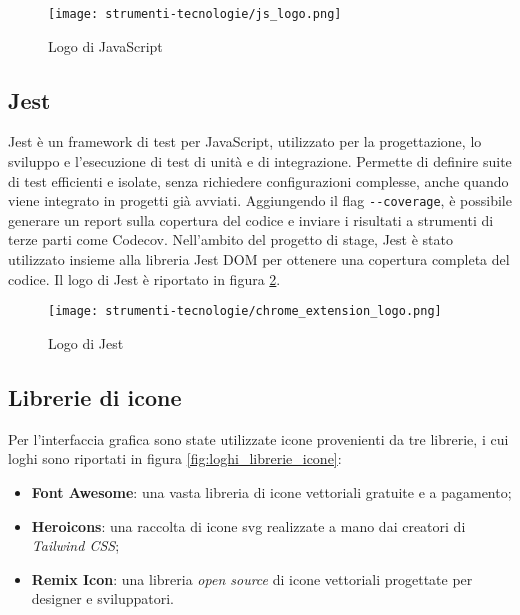 \begin{figure}[H]
  \centering 
  \texttt{[image: strumenti-tecnologie/js\_logo.png]} 
  \caption{Logo di JavaScript}
  \label{fig:logo_javascript} 
\end{figure}

\subsection*{Jest}

\par Jest è un \gls{framework} di test per JavaScript, utilizzato per la progettazione, lo sviluppo e l’esecuzione di test di unità e di integrazione. Permette di definire suite di test efficienti e isolate, senza richiedere configurazioni complesse, anche quando viene integrato in progetti già avviati. Aggiungendo il flag \verb|--coverage|, è possibile generare un report sulla copertura del codice e inviare i risultati a strumenti di terze parti come Codecov. Nell’ambito del progetto di stage, Jest è stato utilizzato insieme alla libreria Jest DOM per ottenere una copertura completa del codice. Il logo di Jest è riportato in figura \ref{fig:logo_jest}.

\begin{figure}[H]
  \centering 
  \texttt{[image: strumenti-tecnologie/chrome\_extension\_logo.png]}  
  \caption{Logo di Jest}
  \label{fig:logo_jest} 
\end{figure}

\subsection*{Librerie di icone}

\par Per l’interfaccia grafica sono state utilizzate icone provenienti da tre librerie, i cui loghi sono riportati in figura \ref{fig:loghi_librerie_icone}:
\begin{itemize}
  \item \textbf{Font Awesome}: una vasta libreria di icone vettoriali gratuite e a pagamento;
  \item \textbf{Heroicons}: una raccolta di icone \gls{svg} realizzate a mano dai creatori di \textit{Tailwind CSS};
  \item \textbf{Remix Icon}: una libreria \textit{open source} di icone vettoriali progettate per designer e sviluppatori.
\end{itemize}

